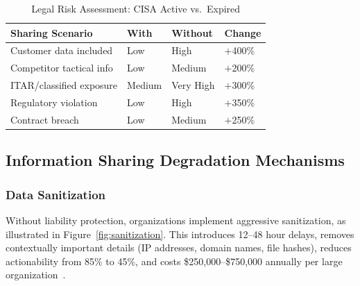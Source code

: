 \documentclass[journal]{IEEEtran}
\begin{document}
\begin{table}[!t]
\caption{Legal Risk Assessment: CISA Active vs.\ Expired}
\centering\small
\begin{tabular}{@{}p{2.8cm}lll@{}}
\toprule
\textbf{Sharing Scenario} & \textbf{With} & \textbf{Without} & \textbf{Change} \\
\midrule
Customer data included   & Low    & High      & $+$400\% \\
Competitor tactical info & Low    & Medium    & $+$200\% \\
ITAR/classified exposure & Medium & Very High & $+$300\% \\
Regulatory violation     & Low    & High      & $+$350\% \\
Contract breach          & Low    & Medium    & $+$250\% \\
\bottomrule
\end{tabular}
\label{tab:risk_factors}
\end{table}

\subsection{Information Sharing Degradation Mechanisms}

\subsubsection{Data Sanitization}
Without liability protection, organizations implement aggressive sanitization, as illustrated in Figure~\ref{fig:sanitization}. This introduces 12--48 hour delays, removes contextually important details (IP addresses, domain names, file hashes), reduces actionability from 85\% to 45\%, and costs \$250,000--\$750,000 annually per large organization~\cite{tschantz2024sanitization}.
\end{document}
